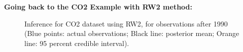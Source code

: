 \documentclass{beamer} %
\begin{document}
\begin{frame}
\textbf{Going back to the CO2 Example with RW2 method:}
\begin{figure}[p]
    \centering
     \caption{\fontsize{7}{11}\selectfont Inference for CO2 dataset using RW2, for observations after 1990 (Blue points: actual observations; Black line: posterior mean; Orange line: 95 percent credible interval).}
    \label{fig:realdata_1990}
\end{figure}
\end{frame}
\end{document}
